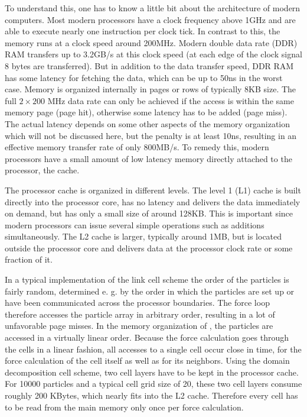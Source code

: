To understand this, one has to know a little bit about the
architecture of modern computers. Most modern processors have a clock
frequency above 1GHz and are able to execute nearly one instruction
per clock tick. In contrast to this, the memory runs at a clock speed
around 200MHz. Modern double data rate (DDR) RAM transfers up to
3.2GB/s at this clock speed (at each edge of the clock signal 8 bytes
are transferred). But in addition to the data transfer speed, DDR RAM
has some latency for fetching the data, which can be up to 50ns in the
worst case. Memory is organized internally in pages or rows of
typically 8KB size. The full $2\times 200$ MHz data rate can only be
achieved if the access is within the same memory page (page hit),
otherwise some latency has to be added (page miss). The actual latency
depends on some other aspects of the memory organization which will
not be discussed here, but the penalty is at least 10ns, resulting in
an effective memory transfer rate of only 800MB/s. To remedy this,
modern processors have a small amount of low latency memory directly
attached to the processor, the cache.

The processor cache is organized in different levels. The level 1 (L1)
cache is built directly into the processor core, has no latency and
delivers the data immediately on demand, but has only a small size of
around 128KB. This is important since modern processors can issue
several simple operations such as additions simultaneously. The L2
cache is larger, typically around 1MB, but is located outside the
processor core and delivers data at the processor clock rate or some
fraction of it.

In a typical implementation of the link cell scheme the order of the
particles is fairly random, determined e. g. by the order in which the
particles are set up or have been communicated across the processor
boundaries. The force loop therefore accesses the particle array in
arbitrary order, resulting in a lot of unfavorable page misses. In
the memory organization of \es{}, the particles are accessed in a
virtually linear order. Because the force calculation goes through the
cells in a linear fashion, all accesses to a single cell occur close
in time, for the force calculation of the cell itself as well as for
its neighbors. Using the domain decomposition cell scheme, two cell
layers have to be kept in the processor cache. For 10000 particles and
a typical cell grid size of 20, these two cell layers consume roughly
200 KBytes, which nearly fits into the L2 cache. Therefore every cell
has to be read from the main memory only once per force calculation.



